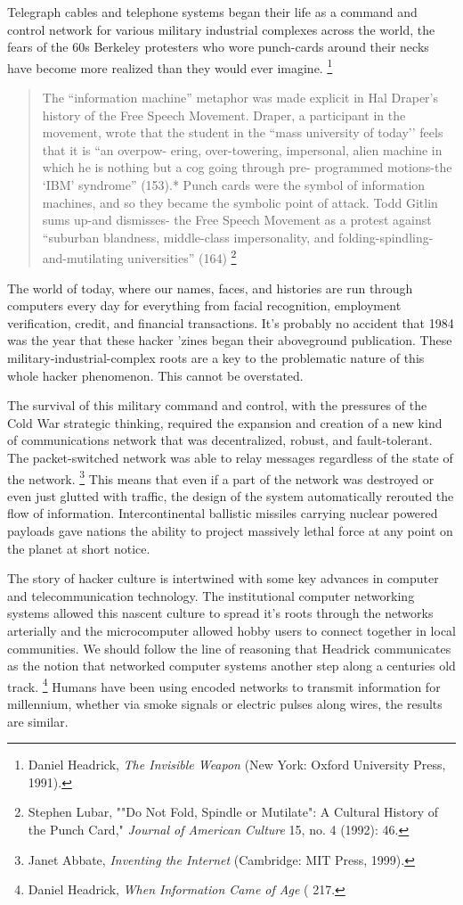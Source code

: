 \documentclass[11pt]{article}
\begin{document}
Telegraph cables and telephone systems began their life as a command and control network for various military industrial complexes across the world, the fears of the 60s Berkeley protesters who wore punch-cards around their necks have become more realized than they would ever imagine.
\footnote{Daniel Headrick, \emph{The Invisible Weapon} (New York: Oxford University Press, 1991).}\begin{quote}The
“information machine” metaphor
was
made
explicit
in
Hal
Draper’s history
of
the
Free
Speech
Movement.
Draper,
a
participant
in
the
movement, wrote
that the student
in
the
“mass
university
of
today’’
feels
that
it
is
“an
overpow-
ering,
over-towering,
impersonal, alien machine
in
which he is
nothing
but
a cog
going through
pre-
programmed
motions-the
‘IBM’
syndrome”
(153).*
Punch
cards
were
the
symbol
of
information
machines,
and
so
they became
the
symbolic
point
of
attack.
Todd Gitlin
sums
up-and dismisses-
the
Free
Speech Movement as
a protest against
“suburban
blandness, middle-class
impersonality,
and
folding-spindling-and-mutilating
universities”
(164)
\footnote{Stephen Lubar, ""Do Not Fold, Spindle or Mutilate": A Cultural History of the Punch Card," \emph{Journal of American Culture} 15, no. 4 (1992): 46.}
\end{quote}
The world of today, where our names, faces, and histories are run through computers every day for everything from facial recognition, employment verification, credit, and financial transactions. It's probably no accident that 1984 was the year that these hacker 'zines began their aboveground publication. These military-industrial-complex roots are a key to the problematic nature of this whole hacker phenomenon. This cannot be overstated.

The survival of this military command and control, with the pressures of the Cold War strategic thinking, required the expansion and creation of a new kind of communications network that was decentralized, robust, and fault-tolerant. The packet-switched network was able to relay messages regardless of the state of the network.
\footnote{Janet Abbate, \emph{Inventing the Internet} (Cambridge: MIT Press, 1999).}
This means that even if a part of the network was destroyed or even just glutted with traffic, the design of the system automatically rerouted the flow of information. Intercontinental ballistic missiles carrying nuclear powered payloads gave nations the ability to project massively lethal force at any point on the planet at short notice.

The story of hacker culture is intertwined with some key advances in computer and telecommunication technology. The institutional computer networking systems allowed this nascent culture to spread it's roots through the networks arterially and the microcomputer allowed hobby users to connect together in local communities. We should follow the line of reasoning that Headrick communicates as the notion that networked computer systems another step along a centuries old track.
\footnote{Daniel Headrick, \emph{When Information Came of Age} ( 217.}
Humans have been using encoded networks to transmit information for millennium, whether via smoke signals or electric pulses along wires, the results are similar.
\end{document}
